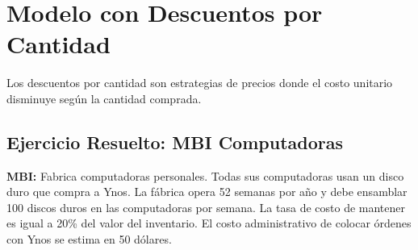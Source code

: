 \documentclass[12pt,a4paper]{book}
\begin{document}
	\section{Modelo con Descuentos por Cantidad}
	
	\begin{tcolorbox}[enhanced,colback=violetaclaro,colframe=moradoacento,boxrule=3pt,arc=12pt,
		drop shadow,title={\Large\bfseries\color{white} \faTag\ FUNDAMENTOS DEL MODELO}]
		
		Los descuentos por cantidad son estrategias de precios donde el costo unitario disminuye según la cantidad comprada.
		
	\end{tcolorbox}
	
	\subsection{Ejercicio Resuelto: MBI Computadoras}
	
	\begin{tcolorbox}[enhanced,colback=naranjaclaro,colframe=naranjaacento,boxrule=2pt,arc=8pt,
		drop shadow,title={\bfseries\color{white} \faPuzzlePiece\ PROBLEMA}]
		
		\textbf{MBI:} Fabrica computadoras personales. Todas sus computadoras usan un disco duro que compra a Ynos. La fábrica opera 52 semanas por año y debe ensamblar 100 discos duros en las computadoras por semana. La tasa de costo de mantener es igual a 20\% del valor del inventario. El costo administrativo de colocar órdenes con Ynos se estima en 50 dólares.
		
	\end{tcolorbox}
	
\end{document}
